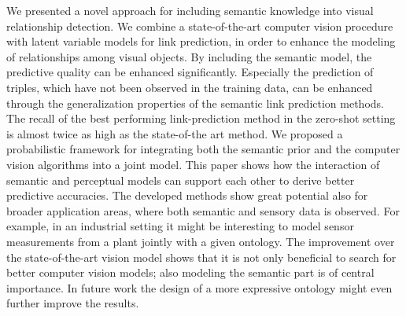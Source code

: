 \documentclass[runningheads,a4paper]{llncs}
\begin{document}
We presented a novel approach for including semantic knowledge into visual relationship detection. We combine a state-of-the-art computer vision procedure with latent variable models for link prediction, in order to enhance the modeling of relationships among visual objects. By including the semantic model, the predictive quality can be enhanced significantly. Especially the prediction of triples, which have not been observed in the training data, can be enhanced through the generalization properties of the semantic link prediction methods. The recall of the best performing link-prediction method in the zero-shot setting is almost twice as high as the state-of-the art method. We proposed a probabilistic framework for integrating both the semantic prior and the computer vision algorithms into a joint model. This paper shows how the interaction of semantic and perceptual models can support each other to derive better predictive accuracies. The developed methods  show great potential also for broader application areas, where both semantic and sensory data is observed. For example, in an industrial setting it might be interesting to model sensor measurements from a plant jointly with a given ontology. The improvement over the state-of-the-art vision model shows that it is not only beneficial to search for better computer vision models; also modeling the semantic part is of central importance. In future work the design of a more expressive ontology might even further improve the results.





\end{document}
